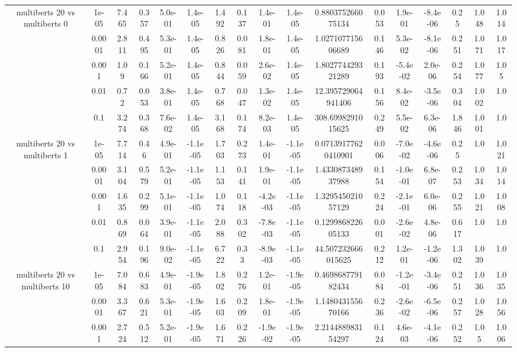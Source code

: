 \begin{tabular}{|c|c|c|c|c|c|c|c|c|c|c|c|c|c|c|c|c|}
\hline
\multirow{5}{*}{multiberts 20 vs multiberts 0} & 1e-05 & 7.465 & 0.357 & 5.0e-01 & 1.4e-05 & 1.492 & 0.137 & 1.4e-01 & 1.4e-05 & 0.880375266075134 & 0.053 & 1.9e-01 & -8.4e-06 & 0.25 & 1.048 & 1.014 \\
 & 0.0001 & 2.811 & 0.495 & 5.3e-01 & 1.4e-05 & 0.826 & 0.081 & 1.8e-01 & 1.4e-05 & 1.027107715606689 & 0.146 & 5.3e-02 & -8.1e-06 & 0.251 & 1.071 & 1.017 \\
 & 0.001 & 1.09 & 0.166 & 5.2e-01 & 1.4e-05 & 0.844 & 0.059 & 2.6e-02 & 1.4e-05 & 1.802774429321289 & 0.193 & -5.4e-02 & 2.0e-06 & 0.254 & 1.077 & 1.05 \\
 & 0.01 & 0.72 & 0.053 & 3.8e-01 & 1.4e-05 & 0.768 & 0.047 & 1.3e-02 & 1.4e-05 & 12.395729064941406 & 0.156 & 8.4e-02 & -3.5e-06 & 0.304 & 1.002 & 1.0 \\
 & 0.1 & 3.274 & 0.368 & 7.6e-02 & 1.4e-05 & 3.168 & 0.174 & 8.2e-03 & 1.4e-05 & 308.6998291015625 & 0.249 & 5.5e-02 & 6.3e-06 & 1.846 & 1.001 & 1.0 \\
\hline
\multirow{5}{*}{multiberts 20 vs multiberts 1} & 1e-05 & 7.714 & 0.46 & 4.9e-01 & -1.1e-05 & 1.703 & 0.273 & 1.4e-01 & -1.1e-05 & 0.07139177620410901 & 0.006 & -7.0e-02 & -4.6e-06 & 0.25 & 1.0 & 1.021 \\
 & 0.0001 & 3.104 & 0.579 & 5.2e-01 & -1.1e-05 & 1.153 & 0.141 & 1.9e-01 & -1.1e-05 & 1.433087348937988 & 0.154 & -1.0e-01 & 6.8e-07 & 0.253 & 1.034 & 1.014 \\
 & 0.001 & 1.635 & 0.299 & 5.1e-01 & -1.1e-05 & 1.074 & 0.118 & -4.2e-03 & -1.1e-05 & 1.329545021057129 & 0.224 & -2.1e-01 & 6.0e-06 & 0.255 & 1.021 & 1.008 \\
 & 0.01 & 0.869 & 0.064 & 3.9e-01 & -1.1e-05 & 2.088 & 0.302 & -7.8e-03 & -1.1e-05 & 0.129986822605133 & 0.001 & -2.6e-02 & 4.8e-06 & 0.617 & 1.0 & 1.0 \\
 & 0.1 & 2.954 & 0.196 & 9.0e-02 & -1.1e-05 & 6.722 & 0.33 & -8.9e-03 & -1.1e-05 & 44.507232666015625 & 0.212 & 1.2e-01 & -1.2e-06 & 1.302 & 1.039 & 1.0 \\
\hline
\multirow{5}{*}{multiberts 20 vs multiberts 10} & 1e-05 & 7.084 & 0.683 & 4.9e-01 & -1.9e-05 & 1.802 & 0.276 & 1.2e-01 & -1.9e-05 & 0.469868779182434 & 0.084 & -1.2e-01 & -3.4e-06 & 0.251 & 1.036 & 1.035 \\
 & 0.0001 & 3.367 & 0.621 & 5.3e-01 & -1.9e-05 & 1.603 & 0.209 & 1.8e-01 & -1.9e-05 & 1.148043155670166 & 0.236 & -2.6e-02 & -6.5e-06 & 0.257 & 1.028 & 1.056 \\
 & 0.001 & 2.724 & 0.512 & 5.2e-01 & -1.9e-05 & 1.671 & 0.226 & -1.9e-02 & -1.9e-05 & 2.214488983154297 & 0.124 & 4.6e-03 & -4.1e-06 & 0.252 & 1.05 & 1.006 \\

\end{tabular}
